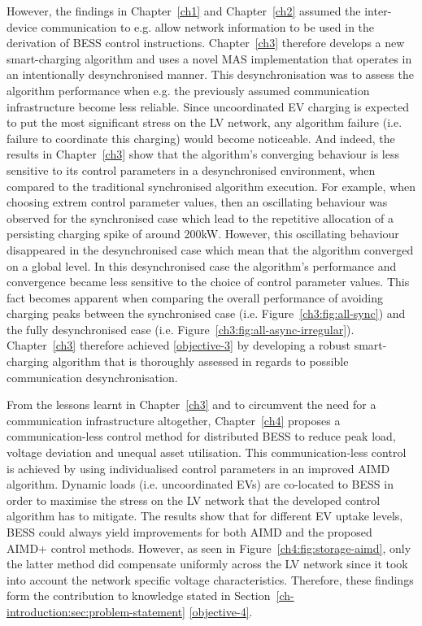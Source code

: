 However, the findings in Chapter~\ref{ch1} and Chapter~\ref{ch2} assumed the inter-device communication to e.g. allow network information to be used in the derivation of BESS control instructions.
Chapter~\ref{ch3} therefore develops a new smart-charging algorithm and uses a novel MAS implementation that operates in an intentionally desynchronised manner.
This desynchronisation was to assess the algorithm performance when e.g. the previously assumed communication infrastructure become less reliable.
Since uncoordinated EV charging is expected to put the most significant stress on the LV network, any algorithm failure (i.e. failure to coordinate this charging) would become noticeable.
And indeed, the results in Chapter~\ref{ch3} show that the algorithm's converging behaviour is less sensitive to its control parameters in a desynchronised environment, when compared to the traditional synchronised algorithm execution.
For example, when choosing extrem control parameter values, then an oscillating behaviour was observed for the synchronised case which lead to the repetitive allocation of a persisting charging spike of around 200kW.
However, this oscillating behaviour disappeared in the desynchronised case which mean that the algorithm converged on a global level.
In this desynchronised case the algorithm's performance and convergence became less sensitive to the choice of control parameter values.
This fact becomes apparent when comparing the overall performance of avoiding charging peaks between the synchronised case (i.e. Figure~\ref{ch3:fig:all-sync}) and the fully desynchronised case (i.e. Figure~\ref{ch3:fig:all-async-irregular}).
Chapter~\ref{ch3} therefore achieved \ref{objective-3} by developing a robust smart-charging algorithm that is thoroughly assessed in regards to possible communication desynchronisation.

From the lessons learnt in Chapter~\ref{ch3} and to circumvent the need for a communication infrastructure altogether, Chapter~\ref{ch4} proposes a communication-less control method for distributed BESS to reduce peak load, voltage deviation and unequal asset utilisation.
This communication-less control is achieved by using individualised control parameters in an improved AIMD algorithm.
Dynamic loads (i.e. uncoordinated EVs) are co-located to BESS in order to maximise the stress on the LV network that the developed control algorithm has to mitigate.
The results show that for different EV uptake levels, BESS could always yield improvements for both AIMD and the proposed AIMD+ control methods.
However, as seen in Figure~\ref{ch4:fig:storage-aimd}, only the latter method did compensate uniformly across the LV network since it took into account the network specific voltage characteristics.
Therefore, these findings form the contribution to knowledge stated in Section~\ref{ch-introduction:sec:problem-statement} \ref{objective-4}.

